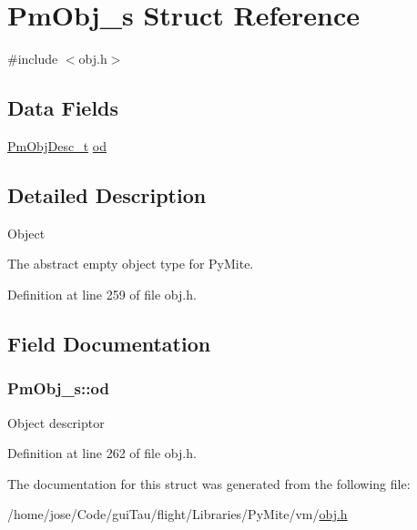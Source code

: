 \hypertarget{struct_pm_obj__s}{\section{Pm\-Obj\-\_\-s Struct Reference}
\label{struct_pm_obj__s}
}


{\ttfamily \#include $<$obj.\-h$>$}

\subsection*{Data Fields}
\begin{DoxyCompactItemize}
\item 
\hyperlink{obj_8h_a72d816790acd8eb550fb25268c2b3489}{Pm\-Obj\-Desc\-\_\-t} \hyperlink{struct_pm_obj__s_a2587fd62c0b5eb7dcc5ca48de92a2e3c}{od}
\end{DoxyCompactItemize}


\subsection{Detailed Description}
Object

The abstract empty object type for Py\-Mite. 

Definition at line 259 of file obj.\-h.



\subsection{Field Documentation}
\hypertarget{struct_pm_obj__s_a2587fd62c0b5eb7dcc5ca48de92a2e3c}{
\subsubsection[{od}]{ Pm\-Obj\-\_\-s\-::od}}\label{struct_pm_obj__s_a2587fd62c0b5eb7dcc5ca48de92a2e3c}
Object descriptor 

Definition at line 262 of file obj.\-h.



The documentation for this struct was generated from the following file\-:\begin{DoxyCompactItemize}
\item 
/home/jose/\-Code/gui\-Tau/flight/\-Libraries/\-Py\-Mite/vm/\hyperlink{obj_8h}{obj.\-h}\end{DoxyCompactItemize}
